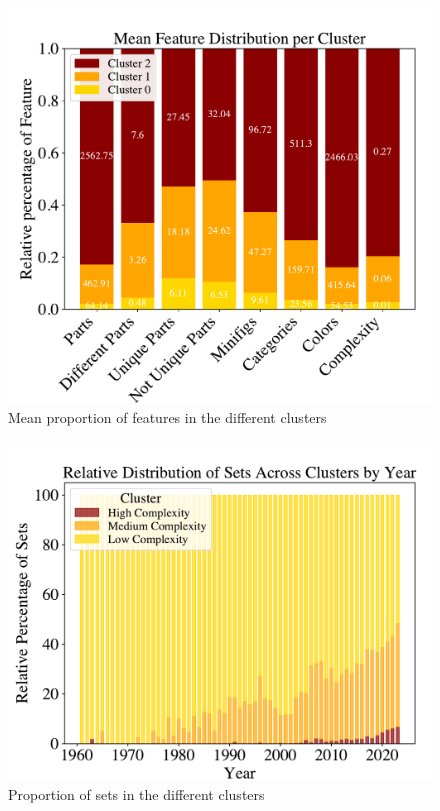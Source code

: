 \documentclass{article}
\theoremstyle{plain}
\theoremstyle{definition}
\theoremstyle{remark}
\begin{document}
\begin{figure}[ht]
 \vskip 0.2in
 \begin{center}
 \centerline{\includegraphics[width=\columnwidth]{../Images/Clusters_features.pdf}}
\caption{Mean proportion of features in the different clusters}
\label{icml-historical}
 \end{center}
 \vskip -0.2in
\end{figure}
\begin{figure}[ht]
 \vskip 0.2in
 \begin{center}
 \centerline{\includegraphics[width=\columnwidth]{../Images/Clusters.pdf}}
\caption{Proportion of sets in the different clusters}
\label{icml-historical}
 \end{center}
 \vskip -0.2in
\end{figure}
\end{document}
